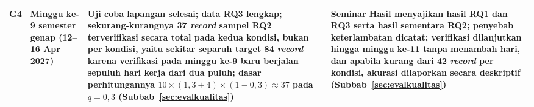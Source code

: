 {\begin{longtable}{|>{\centering\arraybackslash}p{}|L{0.16\textwidth}|L{0.33\textwidth}|L{0.34\textwidth}|}
G4 & Minggu ke-9 semester genap (12--16 Apr 2027) & Uji coba lapangan selesai; data RQ3 lengkap; sekurang-kurangnya 37 \textit{record} sampel RQ2 terverifikasi secara total pada kedua kondisi, bukan per kondisi, yaitu sekitar separuh target 84 \textit{record} karena verifikasi pada minggu ke-9 baru berjalan sepuluh hari kerja dari dua puluh; dasar perhitungannya $10 \times (1{,}3 + 4) \times (1 - 0{,}3) \approx 37$ pada $q = 0{,}3$ (Subbab~\ref{sec:evalkualitas}) & Seminar Hasil menyajikan hasil RQ1 dan RQ3 serta hasil sementara RQ2; penyebab keterlambatan dicatat; verifikasi dilanjutkan hingga minggu ke-11 tanpa menambah hari, dan apabila kurang dari 42 \textit{record} per kondisi, akurasi dilaporkan secara deskriptif (Subbab~\ref{sec:evalkualitas}) \\ \hline
\end{longtable}
}
